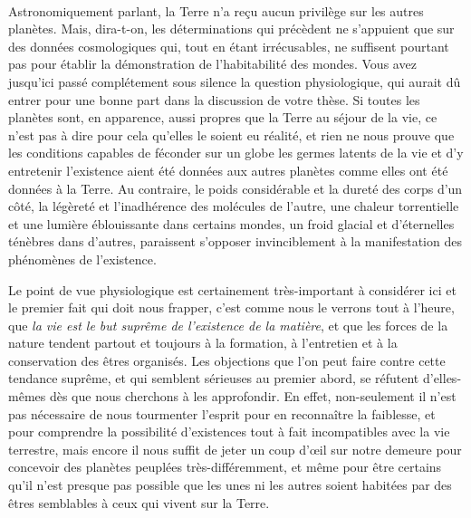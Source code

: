 \documentclass[a4paper, 11pt, oneside]{article}
\begin{document}
\paragraph{}
Astronomiquement parlant, la Terre n'a reçu aucun privilège sur les autres planètes. Mais, dira-t-on, les déterminations qui précèdent ne s'appuient que sur des données cosmologiques qui, tout en étant irrécusables, ne suffisent pourtant pas pour établir la démonstration de l'habitabilité des mondes. Vous avez jusqu'ici passé complétement sous silence la question physiologique, qui aurait dû entrer pour une bonne part dans la discussion de votre thèse. Si toutes les planètes sont, en apparence, aussi propres que la Terre au séjour de la vie, ce n'est pas à dire pour cela qu'elles le soient eu réalité, et rien ne nous prouve que les conditions capables de féconder sur un globe les germes latents de la vie et d'y entretenir l'existence aient été données aux autres planètes comme elles ont été données à la Terre. Au contraire, le poids considérable et la dureté des corps d'un côté, la légèreté et l'inadhérence des molécules de l'autre, une chaleur torrentielle et une lumière éblouissante dans certains mondes, un froid glacial et d'éternelles ténèbres dans d'autres, paraissent s'opposer invinciblement à la manifestation des phénomènes de l'existence.

Le point de vue physiologique est certainement très-important à considérer ici et le premier fait qui doit nous frapper, c'est comme nous le verrons tout à l'heure, que \emph{la vie est le but suprême de l'existence de la matière}, et que les forces de la nature tendent partout et toujours à la formation, à l'entretien et à la conservation des êtres organisés. Les objections que l'on peut faire contre cette tendance suprême, et qui semblent sérieuses au premier abord, se réfutent d'elles-mêmes dès que nous cherchons à les approfondir. En effet, non-seulement il n'est pas nécessaire de nous tourmenter l'esprit pour en reconnaître la faiblesse, et pour comprendre la possibilité d'existences tout à fait incompatibles avec la vie terrestre, mais encore il nous suffit de jeter un coup d'œil sur notre demeure pour concevoir des planètes peuplées très-différemment, et même pour être certains qu'il n'est presque pas possible que les unes ni les autres soient habitées par des êtres semblables à ceux qui vivent sur la Terre.
\end{document}
